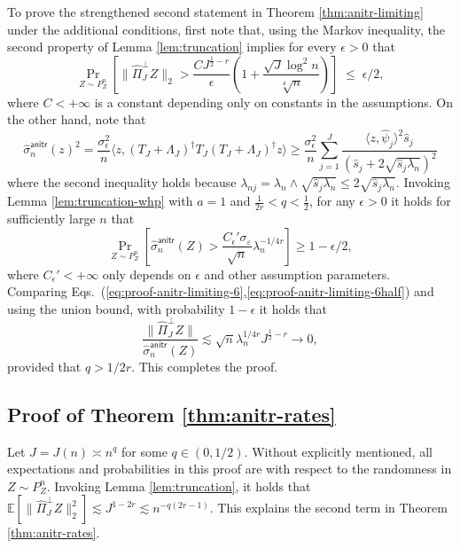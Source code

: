\documentclass[11pt,a4paper]{article}
\renewcommand{\hat}{\widehat}
\theoremstyle{definition}
\theoremstyle{plain}
\theoremstyle{remark}
\newcommand{\anitr}{\mathsf{anitr}}
\begin{document}
To prove the strengthened second statement in Theorem \ref{thm:anitr-limiting} under the additional conditions, first note that, using the Markov inequality, the second property of Lemma \ref{lem:truncation} implies
for every $\epsilon>0$ that 
\begin{equation}
\Pr_{Z\sim P_Z^n}\left[\|\hat\Pi_J^\perp Z\|_2 > \frac{CJ^{\frac{1}{2}-r}}{\epsilon}\left(1+\frac{\sqrt{J}\log^2 n}{\sqrt[4]{n}}\right)\right] \;\leq\; \epsilon/2,
\label{eq:proof-anitr-limiting-6}
\end{equation}
where $C<+\infty$ is a constant depending only on constants in the assumptions.
On the other hand, note that 
$$
\hat\sigma_n^\anitr(z)^2 = \frac{\sigma_\epsilon^2}{n}\langle z,(T_J+\Lambda_J)^\dagger T_J(T_J+\Lambda_J)^\dagger z\rangle \geq \frac{\sigma_\epsilon^2}{n}  \sum_{j=1}^J\frac{\langle z,\hat\psi_j\rangle^2\hat s_j}{(\hat s_j+2\sqrt{\hat s_j\lambda_n})^2}
$$
where the second inequality holds because $\lambda_{nj}=\lambda_n\wedge\sqrt{\hat s_j\lambda_n}\leq 2\sqrt{\hat s_j\lambda_n}$.
Invoking Lemma \ref{lem:truncation-whp} with $a=1$ and $\frac{1}{2r}<q<\frac{1}{2}$, for any $\epsilon>0$ it holds for sufficiently large $n$ that
\begin{equation}
\Pr_{Z\sim P_Z^n}\left[\hat\sigma_n^\anitr(Z) > \frac{C_\epsilon'\sigma_\varepsilon}{\sqrt{n}}\lambda_n^{-1/4r}\right]\geq 1-\epsilon/2,
\label{eq:proof-anitr-limiting-6half}
\end{equation}
where $C_\epsilon'<+\infty$ only depends on $\epsilon$ and other assumption parameters.
Comparing Eqs.~(\ref{eq:proof-anitr-limiting-6},\ref{eq:proof-anitr-limiting-6half}) and using the union bound, with probability $1-\epsilon$ it holds that
$$
\frac{\|\hat\Pi_J^\perp Z\|}{\hat\sigma_n^\anitr(Z)} \lesssim \sqrt{n}\lambda_n^{1/4r} J^{\frac{1}{2}-r} \to 0, 
$$
provided that $q>1/2r$. This completes the proof.


\subsection{Proof of Theorem \ref{thm:anitr-rates}}
Let $J=J(n)\asymp n^q$ for some $q\in(0,1/2)$.
Without explicitly mentioned, all expectations and probabilities in this proof are with respect to the randomness in $Z\sim P_Z^n$.
Invoking Lemma \ref{lem:truncation}, it holds that $\mathbb E[\|\hat\Pi_J^\perp Z\|_2^2]\lesssim J^{1-2r} \lesssim n^{-q(2r-1)}$. This explains the second term in Theorem \ref{thm:anitr-rates}.
\end{document}
